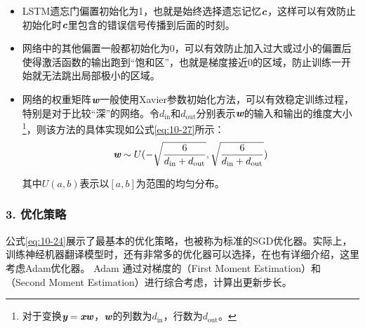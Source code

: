 \begin{itemize}
\vspace{0.5em}
\item LSTM遗忘门偏置初始化为1，也就是始终选择遗忘记忆$\textbf{\em c}$，这样可以有效防止初始化时$\textbf{\em c}$里包含的错误信号传播到后面的时刻。
\vspace{0.5em}
\item 网络中的其他偏置一般都初始化为0，可以有效防止加入过大或过小的偏置后使得激活函数的输出跑到“饱和区”，也就是梯度接近0的区域，防止训练一开始就无法跳出局部极小的区域。
\vspace{0.5em}
\item 网络的权重矩阵$\textbf{\em w}$一般使用Xavier参数初始化方法，可以有效稳定训练过程，特别是对于比较“深”的网络。令$d_{\textrm{in}}$和$d_{\textrm{out}}$分别表示$\textbf{\em w}$的输入和输出的维度大小\footnote{对于变换$\textbf{\em y} = \textbf{\em x} \textbf{\em w}$，$\textbf{\em w}$的列数为$d_{\textrm{in}}$，行数为$d_{\textrm{out}}$。}，则该方法的具体实现如公式\eqref{eq:10-27}所示：
\begin{eqnarray}
\mathbi{w} \sim U(-\sqrt{ \frac{6} { d_{\textrm{in}} + d_{\textrm{out}} } } , \sqrt{ \frac{6} { d_{\textrm{in}} + d_{\textrm{out}} } })
\label{eq:10-27}
\vspace{0.5em}
\end{eqnarray}

其中$U(a,b)$表示以$[a,b]$为范围的均匀分布。\\
\end{itemize}

\vspace{-2.5em}
\subsubsection{3. 优化策略}

\parinterval 公式\eqref{eq:10-24}展示了最基本的优化策略，也被称为标准的SGD优化器。实际上，训练神经机器翻译模型时，还有非常多的优化器可以选择，在{\chapternine}也有详细介绍，这里考虑Adam优化器。 Adam 通过对梯度的{\small{}}（First Moment Estimation）和{\small{}}（Second Moment Estimation）进行综合考虑，计算出更新步长。

